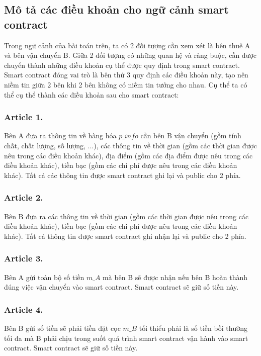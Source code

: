 \subsection{Mô tả các điều khoản cho ngữ cảnh smart contract}

Trong ngữ cảnh của bài toán trên, ta có 2 đối tượng cần xem xét là bên thuê A và bên vận chuyển B. Giữa 2 đối tượng có những quan hệ và ràng buộc, cần được chuyển thành những điều khoản cụ thể được quy định trong smart contract. Smart contract đóng vai trò là bên thứ 3 quy định các điều khoản này, tạo nên niềm tin giữa 2 bên khi 2 bên không có niềm tin tưởng cho nhau. Cụ thể ta có thể cụ thể thành các điều khoản sau cho smart contract:


\subsubsection*{Article 1.}
Bên A đưa ra thông tin về hàng hóa $ p\_info $ cần bên B vận chuyển (gồm tính chất, chất lượng, số lượng, ...), các thông tin về thời gian (gồm các thời gian được nêu trong các điều khoản khác), địa điểm (gồm các địa điểm được nêu trong các điều khoản khác), tiền bạc (gồm các chi phí được nêu trong các điều khoản khác). Tất cả các thông tin được smart contract ghi lại và public cho 2 phía.

\subsubsection*{Article 2.}
Bên B đưa ra các thông tin về thời gian (gồm các thời gian được nêu trong các điều khoản khác), tiền bạc (gồm các chi phí được nêu trong các điều khoản khác). Tất cả thông tin được smart contract ghi nhận lại và public cho 2 phía.

\subsubsection*{Article 3.}
Bên A gửi toàn bộ số tiền $ m\_A $ mà bên B sẽ được nhận nếu bên B hoàn thành đúng việc vận chuyển vào smart contract. Smart contract sẽ giữ số tiền này.

\subsubsection*{Article 4.}
Bên B gửi số tiền sẽ phải tiền đặt cọc $ m\_B $ tối thiểu phải là số tiền bồi thường tối đa mà B phải chịu trong suốt quá trình smart contract vận hành vào smart contract. Smart contract sẽ giữ số tiền này.

